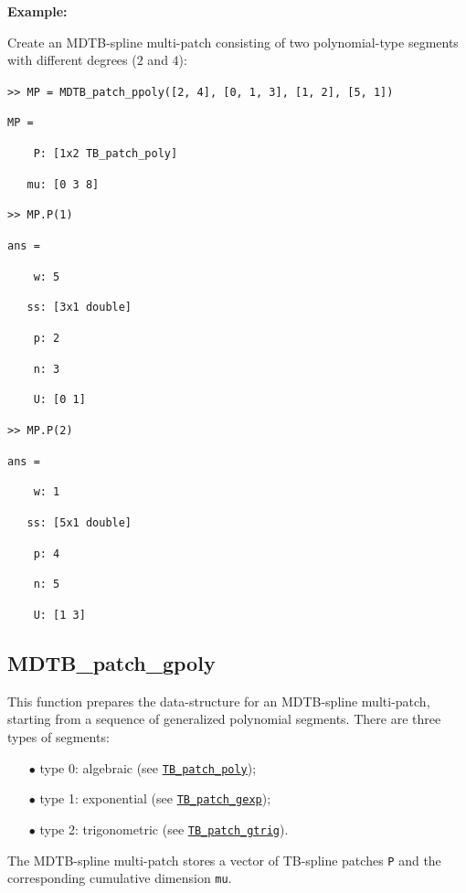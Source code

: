 \documentclass[10pt]{acmtrans2e}
\newenvironment{example}
{\vspace*{0.1cm}
\noindent \textbf{Example:} \vspace*{0.15cm}

\setlength{\parskip}{0.5ex plus 0.5exminus 0.2 ex}
}
{\medskip
}
\begin{document}
\begin{example}
\noindent Create an MDTB-spline multi-patch consisting of two polynomial-type segments with different degrees ($2$ and $4$): 
\medskip

\texttt{>> MP = MDTB\_patch\_ppoly([2, 4], [0, 1, 3], [1, 2], [5, 1])}

\texttt{MP = }

\texttt{\ \ \ \ P:\ [1x2 TB\_patch\_poly]}

\texttt{\ \ \ mu:\ [0 3 8]}

\texttt{>> MP.P(1)}

\texttt{ans =}

\texttt{\ \ \ \ w:\ 5}

\texttt{\ \ \ ss:\ [3x1 double]}

\texttt{\ \ \ \ p:\ 2}

\texttt{\ \ \ \ n:\ 3}

\texttt{\ \ \ \ U:\ [0 1]}

\pagebreak

\texttt{>> MP.P(2)}

\texttt{ans =}

\texttt{\ \ \ \ w:\ 1}

\texttt{\ \ \ ss:\ [5x1 double]}

\texttt{\ \ \ \ p:\ 4}

\texttt{\ \ \ \ n:\ 5}

\texttt{\ \ \ \ U:\ [1 3]}    
\end{example}


\subsection{MDTB\_patch\_gpoly} \label{sec:matlab-mdtb-patch-gpoly}

This function prepares the data-structure for an MDTB-spline multi-patch, starting from a sequence of generalized polynomial segments. There are three types of segments:
\begin{itemize}
  \item[$\bullet$] type 0: algebraic (see \hyperref[sec:matlab-tb-patch-poly]{\texttt{TB\_patch\_poly}});
  \item[$\bullet$] type 1: exponential (see \hyperref[sec:matlab-tb-patch-gexp]{\texttt{TB\_patch\_gexp}});
  \item[$\bullet$] type 2: trigonometric (see \hyperref[sec:matlab-tb-patch-gtrig]{\texttt{TB\_patch\_gtrig}}).
\end{itemize}
The MDTB-spline multi-patch stores a vector of TB-spline patches \texttt{P} and the corresponding cumulative dimension \texttt{mu}. 
\end{document}
